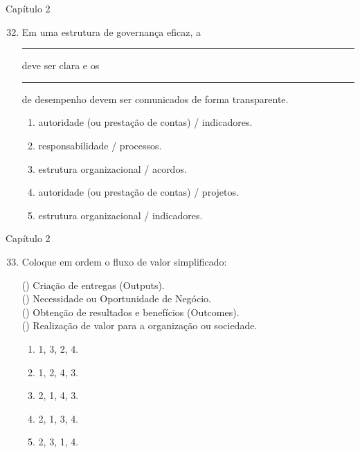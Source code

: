 \documentclass{beamer}
\begin{document}
\begin{frame}{Capítulo 2}
	\begin{enumerate}
		\setcounter{enumi}{31}
		\justifying
		\item Em uma estrutura de governança eficaz, a \rule{50pt}{1pt} deve ser clara e os \rule{50pt}{1pt} de desempenho devem ser comunicados de forma transparente.
		\begin{enumerate}[a]
			\item \alert<2>{autoridade (ou prestação de contas) / indicadores}.
			\item responsabilidade / processos.
			\item estrutura organizacional / acordos.
			\item autoridade (ou prestação de contas) / projetos.
			\item estrutura organizacional / indicadores.
		\end{enumerate}
	\end{enumerate}
\end{frame}

\begin{frame}{Capítulo 2}
	\begin{enumerate}
		\setcounter{enumi}{32}
		\justifying
		\item Coloque em ordem o fluxo de valor simplificado:
		
		(\hspace{10pt}) Criação de entregas (Outputs).\\
		(\hspace{10pt}) Necessidade ou Oportunidade de Negócio.\\
		(\hspace{10pt}) Obtenção de resultados e benefícios (Outcomes).\\
		(\hspace{10pt}) Realização de valor para a organização ou sociedade.
		
		\vspace{10pt}
		\begin{enumerate}[a]
			\item 1, 3, 2, 4.
			\item 1, 2, 4, 3.
			\item 2, 1, 4, 3.
			\item \alert<2>{2, 1, 3, 4}.
			\item 2, 3, 1, 4.
		\end{enumerate}
	\end{enumerate}
\end{frame}
\end{document}
